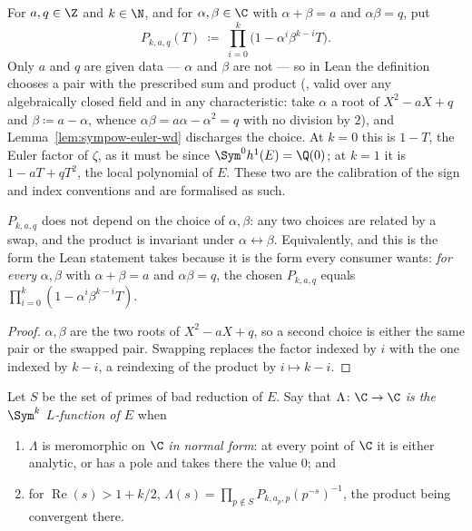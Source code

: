 \begin{definition}
  \label{def:sympow-euler}
  For $a, q \in \Z$ and $k \in \N$, and for $\alpha,\beta \in \C$ with $\alpha+\beta = a$ and
  $\alpha\beta = q$, put
  \[
    P_{k,a,q}(T) \;\coloneqq\; \prod_{i=0}^{k}\bigl(1 - \alpha^{i}\beta^{k-i}T\bigr).
  \]
  Only $a$ and $q$ are given data --- $\alpha$ and $\beta$ are not --- so in Lean the
  definition chooses a pair with the prescribed sum and product (, valid
  over any algebraically closed field and in any characteristic: take $\alpha$ a root of
  $X^{2}-aX+q$ and $\beta \coloneqq a - \alpha$, whence $\alpha\beta = a\alpha - \alpha^{2} = q$
  with no division by $2$), and Lemma~\ref{lem:sympow-euler-wd} discharges the choice.
  At $k=0$ this is $1-T$, the Euler factor of $\zeta$, as it must be since
  $\Sym^{0}h^{1}(E)=\Q(0)$; at $k=1$ it is $1 - aT + qT^{2}$, the local polynomial of $E$.
  These two are the calibration of the sign and index conventions and are formalised as such.
\end{definition}

\begin{lemma}
  \label{lem:sympow-euler-wd}
  $P_{k,a,q}$ does not depend on the choice of $\alpha,\beta$: any two choices are related by
  a swap, and the product is invariant under $\alpha \leftrightarrow \beta$. Equivalently, and
  this is the form the Lean statement takes because it is the form every consumer wants:
  \emph{for every} $\alpha,\beta$ with $\alpha+\beta=a$ and $\alpha\beta=q$, the chosen
  $P_{k,a,q}$ equals $\prod_{i=0}^{k}(1-\alpha^{i}\beta^{k-i}T)$.
\end{lemma}
\begin{proof}
  $\alpha,\beta$ are the two roots of $X^{2}-aX+q$, so a second choice is either the same pair
  or the swapped pair. Swapping replaces the factor indexed by $i$ with the one indexed by
  $k-i$, a reindexing of the product by $i \mapsto k-i$.
\end{proof}

\begin{definition}
  \label{def:sympow-isL}
  Let $S$ be the set of primes of bad reduction of $E$. Say that $\Lambda \colon \C \to \C$
  \emph{is the $\Sym^{k}$ $L$-function of $E$} when
  \begin{enumerate}
    \item $\Lambda$ is meromorphic on $\C$ \emph{in normal form}: at every point of $\C$ it is
      either analytic, or has a pole and takes there the value $0$; and
    \item for $\operatorname{Re}(s) > 1 + k/2$,
      $\displaystyle \Lambda(s) = \prod_{p \notin S} P_{k,a_{p},p}(p^{-s})^{-1}$,
      the product being convergent there.
  \end{enumerate}
\end{definition}

